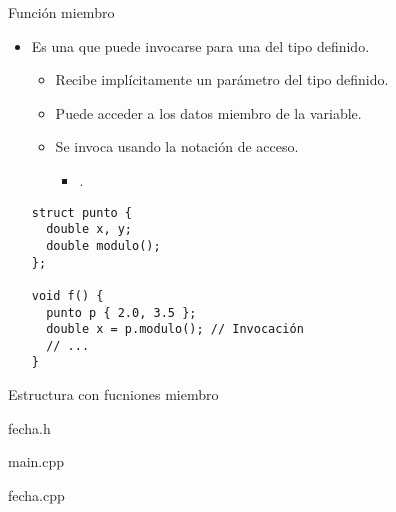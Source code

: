 \begin{frame}[fragile]{Función miembro}
\begin{itemize}
  \item Es una  que puede invocarse 
         para una  del tipo definido.
    \begin{itemize}
      \item Recibe implícitamente un parámetro del tipo definido.
      \item Puede acceder a los datos miembro de la variable.
      \item Se invoca usando la notación de acceso.
        \begin{itemize}
          \item {}.
        \end{itemize}
    \end{itemize}
\begin{lstlisting}
struct punto {
  double x, y;
  double modulo();
};

void f() {
  punto p { 2.0, 3.5 };
  double x = p.modulo(); // Invocación
  // ...
}
\end{lstlisting}
\end{itemize}
\end{frame}

\begin{frame}{Estructura con fucniones miembro}
\begin{block}{fecha.h}

\end{block}
\begin{block}{main.cpp}

\end{block}
\end{frame}

\begin{frame}
\begin{block}{fecha.cpp}
\mode<presentation>{

}
\end{block}
\end{frame}

